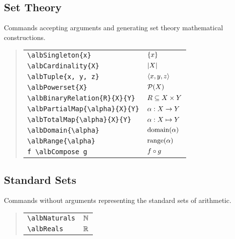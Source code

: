 \documentclass[11pt,a4paper,oneside]{alb-corp}
\begin{document}
\subsection{Set Theory}
\label{sec:alb-order-theory-documentation:set-theory}

Commands accepting arguments and generating set theory mathematical
constructions.

\begin{quote}
  \begin{tabular}{p{}@{\qquad}p{}}
    \verb$\albSingleton{x}$ & $\left\{ x \right\}$ \\
    \verb$\albCardinality{X}$ & $\left| X \right|$ \\
    \verb$\albTuple{x, y, z}$ & $\albTuple{x, y, z}$ \\
    \verb$\albPowerset{X}$ & $\mathcal{P}(X)$ \\
    \verb$\albBinaryRelation{R}{X}{Y}$ & $\albBinaryRelation{R}{X}{Y}$ \\
    \verb$\albPartialMap{\alpha}{X}{Y}$ %
    & $\albPartialMap{\alpha}{X}{Y}$ \\
    \verb$\albTotalMap{\alpha}{X}{Y}$ %
    & $\albTotalMap{\alpha}{X}{Y}$ \\
    \verb$\albDomain{\alpha}$ & $\operatorname{domain}(\alpha)$ \\
    \verb$\albRange{\alpha}$ & $\operatorname{range}(\alpha)$ \\
    \verb$f \albCompose g$ & $f \circ g$
  \end{tabular}
\end{quote}



\subsection{Standard Sets}
\label{sec:alb-order-theory-documentation:stand-sets}

Commands without arguments representing the standard sets of arithmetic.

\begin{quote}
  \begin{tabular}{p{}@{\qquad}p{}}
    \verb$\albNaturals$ & $\albNaturals$ \\
    \verb$\albReals$ & $\albReals$
  \end{tabular}
\end{quote}
\end{document}
